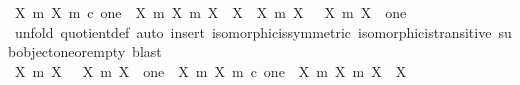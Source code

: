 \begin{isabellebody}
\ {\isachardoublequoteopen}{\isacharbraceleft}{\kern0pt}{\isacharparenleft}{\kern0pt}X{\isacharcomma}{\kern0pt}\ m{\isacharparenright}{\kern0pt}{\isachardot}{\kern0pt}\ {\isacharparenleft}{\kern0pt}X{\isacharcomma}{\kern0pt}\ m{\isacharparenright}{\kern0pt}\ {\isasymsubseteq}\isactrlsub c\ one{\isacharbraceright}{\kern0pt}\ {\isacharslash}{\kern0pt}{\isacharslash}{\kern0pt}\ {\isacharbraceleft}{\kern0pt}{\isacharparenleft}{\kern0pt}{\isacharparenleft}{\kern0pt}X{}{\isacharcomma}{\kern0pt}\ m{}{\isacharparenright}{\kern0pt}{\isacharcomma}{\kern0pt}\ {\isacharparenleft}{\kern0pt}X{}{\isacharcomma}{\kern0pt}\ m{}{\isacharparenright}{\kern0pt}{\isacharparenright}{\kern0pt}{\isachardot}{\kern0pt}\ X{}\ {\isasymcong}\ X{}{\isacharbraceright}{\kern0pt}\ {\isasymsubseteq}\ {\isacharbraceleft}{\kern0pt}{\isacharbraceleft}{\kern0pt}{\isacharparenleft}{\kern0pt}X{\isacharcomma}{\kern0pt}\ m{\isacharparenright}{\kern0pt}{\isachardot}{\kern0pt}\ X\ {\isasymcong}\ {\isasymemptyset}{\isacharbraceright}{\kern0pt}{\isacharcomma}{\kern0pt}\ {\isacharbraceleft}{\kern0pt}{\isacharparenleft}{\kern0pt}X{\isacharcomma}{\kern0pt}\ m{\isacharparenright}{\kern0pt}{\isachardot}{\kern0pt}\ X\ {\isasymcong}\ one{\isacharbraceright}{\kern0pt}{\isacharbraceright}{\kern0pt}{\isachardoublequoteclose}\isanewline
\ \ \ \ \ \ \isamarkupfalse%
\ {\isacharparenleft}{\kern0pt}unfold\ quotient{\isacharunderscore}{\kern0pt}def{\isacharcomma}{\kern0pt}\ auto{\isacharcomma}{\kern0pt}\ insert\ isomorphic{\isacharunderscore}{\kern0pt}is{\isacharunderscore}{\kern0pt}symmetric\ isomorphic{\isacharunderscore}{\kern0pt}is{\isacharunderscore}{\kern0pt}transitive\ subobject{\isacharunderscore}{\kern0pt}one{\isacharunderscore}{\kern0pt}or{\isacharunderscore}{\kern0pt}empty{\isacharcomma}{\kern0pt}\ blast{\isacharplus}{\kern0pt}{\isacharparenright}{\kern0pt}\isanewline
\ \ \isamarkupfalse%
\isanewline
\ \ \ \ \isamarkupfalse%
\ {\isachardoublequoteopen}{\isacharbraceleft}{\kern0pt}{\isacharbraceleft}{\kern0pt}{\isacharparenleft}{\kern0pt}X{\isacharcomma}{\kern0pt}\ m{\isacharparenright}{\kern0pt}{\isachardot}{\kern0pt}\ X\ {\isasymcong}\ {\isasymemptyset}{\isacharbraceright}{\kern0pt}{\isacharcomma}{\kern0pt}\ {\isacharbraceleft}{\kern0pt}{\isacharparenleft}{\kern0pt}X{\isacharcomma}{\kern0pt}\ m{\isacharparenright}{\kern0pt}{\isachardot}{\kern0pt}\ X\ {\isasymcong}\ one{\isacharbraceright}{\kern0pt}{\isacharbraceright}{\kern0pt}\ {\isasymsubseteq}\ {\isacharbraceleft}{\kern0pt}{\isacharparenleft}{\kern0pt}X{\isacharcomma}{\kern0pt}\ m{\isacharparenright}{\kern0pt}{\isachardot}{\kern0pt}\ {\isacharparenleft}{\kern0pt}X{\isacharcomma}{\kern0pt}\ m{\isacharparenright}{\kern0pt}\ {\isasymsubseteq}\isactrlsub c\ one{\isacharbraceright}{\kern0pt}\ {\isacharslash}{\kern0pt}{\isacharslash}{\kern0pt}\ {\isacharbraceleft}{\kern0pt}{\isacharparenleft}{\kern0pt}{\isacharparenleft}{\kern0pt}X{}{\isacharcomma}{\kern0pt}\ m{}{\isacharparenright}{\kern0pt}{\isacharcomma}{\kern0pt}\ X{}{\isacharcomma}{\kern0pt}\ m{}{\isacharparenright}{\kern0pt}{\isachardot}{\kern0pt}\ X{}\ {\isasymcong}\ X{}{\isacharbraceright}{\kern0pt}{\isachardoublequoteclose}\isanewline

\end{isabellebody}
